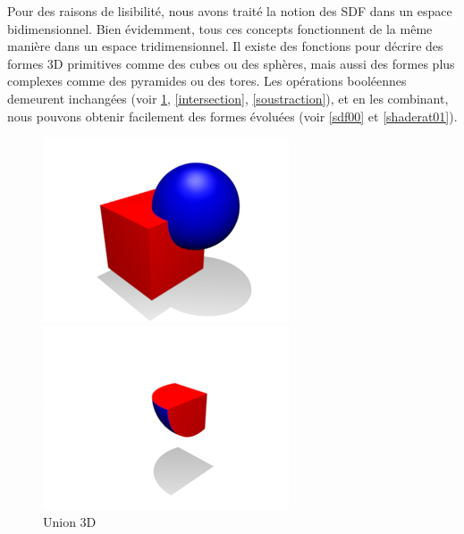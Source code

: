 Pour des raisons de lisibilité, nous avons traité la notion des SDF dans un espace bidimensionnel. Bien évidemment, tous ces concepts fonctionnent de la même manière dans un espace tridimensionnel. Il existe des fonctions pour décrire des formes 3D primitives comme des cubes ou des sphères, mais aussi des formes plus complexes comme des pyramides ou des tores. Les opérations booléennes demeurent inchangées (voir \ref{union}, \ref{intersection}, \ref{soustraction}), et en les combinant, nous pouvons obtenir facilement des formes évoluées (voir \ref{sdf00} et \ref{shaderat01}).

\begin{figure}[h]
  \begin{minipage}[b]{0.3\linewidth}
    \centering
    \includegraphics[width=.9\linewidth]{images//sdf/union.png}
    \caption{Union 3D}
    \label{union}
  \end{minipage}
  \hspace{0.075\linewidth} %
  \begin{minipage}[b]{0.3\linewidth}
    \centering
    \includegraphics[width=.9\linewidth]{images//sdf/intersection.png}

\end{minipage}
\end{figure}
